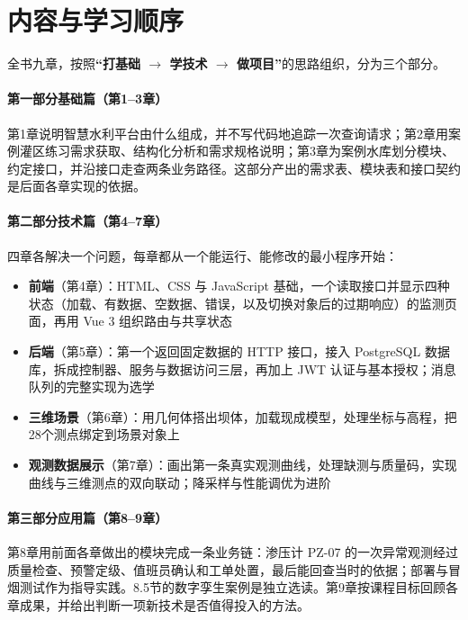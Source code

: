 \section*{内容与学习顺序}

全书九章，按照\textbf{“打基础 $\rightarrow$ 学技术 $\rightarrow$ 做项目”}的思路组织，分为三个部分。

\begin{tipbox}
\paragraph{第一部分\quad 基础篇（第1--3章）}

第1章说明智慧水利平台由什么组成，并不写代码地追踪一次查询请求；第2章用案例灌区练习需求获取、结构化分析和需求规格说明；第3章为案例水库划分模块、约定接口，并沿接口走查两条业务路径。这部分产出的需求表、模块表和接口契约是后面各章实现的依据。
\end{tipbox}

\begin{tipbox}
\paragraph{第二部分\quad 技术篇（第4--7章）}

四章各解决一个问题，每章都从一个能运行、能修改的最小程序开始：
\begin{itemize}
\item \textbf{前端}（第4章）：HTML、CSS 与 JavaScript 基础，一个读取接口并显示四种状态（加载、有数据、空数据、错误，以及切换对象后的过期响应）的监测页面，再用 Vue 3 组织路由与共享状态
\item \textbf{后端}（第5章）：第一个返回固定数据的 HTTP 接口，接入 PostgreSQL 数据库，拆成控制器、服务与数据访问三层，再加上 JWT 认证与基本授权；消息队列的完整实现为选学
\item \textbf{三维场景}（第6章）：用几何体搭出坝体，加载现成模型，处理坐标与高程，把28个测点绑定到场景对象上
\item \textbf{观测数据展示}（第7章）：画出第一条真实观测曲线，处理缺测与质量码，实现曲线与三维测点的双向联动；降采样与性能调优为进阶
\end{itemize}
\end{tipbox}

\begin{tipbox}
\paragraph{第三部分\quad 应用篇（第8--9章）}

第8章用前面各章做出的模块完成一条业务链：渗压计 PZ-07 的一次异常观测经过质量检查、预警定级、值班员确认和工单处置，最后能回查当时的依据；部署与冒烟测试作为指导实践。8.5节的数字孪生案例是独立选读。第9章按课程目标回顾各章成果，并给出判断一项新技术是否值得投入的方法。
\end{tipbox}

